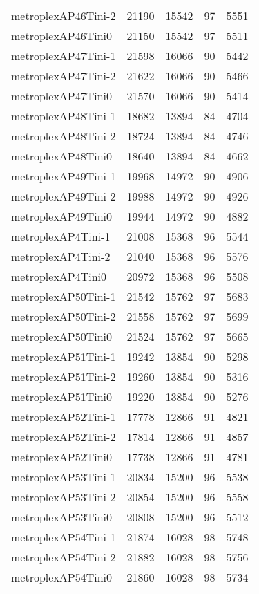 \begin{longtable}{lrrrr}
metroplexAP46Tini-2 & 21190 & 15542 & 97 & 5551 \\
metroplexAP46Tini0 & 21150 & 15542 & 97 & 5511 \\
metroplexAP47Tini-1 & 21598 & 16066 & 90 & 5442 \\
metroplexAP47Tini-2 & 21622 & 16066 & 90 & 5466 \\
metroplexAP47Tini0 & 21570 & 16066 & 90 & 5414 \\
metroplexAP48Tini-1 & 18682 & 13894 & 84 & 4704 \\
metroplexAP48Tini-2 & 18724 & 13894 & 84 & 4746 \\
metroplexAP48Tini0 & 18640 & 13894 & 84 & 4662 \\
metroplexAP49Tini-1 & 19968 & 14972 & 90 & 4906 \\
metroplexAP49Tini-2 & 19988 & 14972 & 90 & 4926 \\
metroplexAP49Tini0 & 19944 & 14972 & 90 & 4882 \\
metroplexAP4Tini-1 & 21008 & 15368 & 96 & 5544 \\
metroplexAP4Tini-2 & 21040 & 15368 & 96 & 5576 \\
metroplexAP4Tini0 & 20972 & 15368 & 96 & 5508 \\
metroplexAP50Tini-1 & 21542 & 15762 & 97 & 5683 \\
metroplexAP50Tini-2 & 21558 & 15762 & 97 & 5699 \\
metroplexAP50Tini0 & 21524 & 15762 & 97 & 5665 \\
metroplexAP51Tini-1 & 19242 & 13854 & 90 & 5298 \\
metroplexAP51Tini-2 & 19260 & 13854 & 90 & 5316 \\
metroplexAP51Tini0 & 19220 & 13854 & 90 & 5276 \\
metroplexAP52Tini-1 & 17778 & 12866 & 91 & 4821 \\
metroplexAP52Tini-2 & 17814 & 12866 & 91 & 4857 \\
metroplexAP52Tini0 & 17738 & 12866 & 91 & 4781 \\
metroplexAP53Tini-1 & 20834 & 15200 & 96 & 5538 \\
metroplexAP53Tini-2 & 20854 & 15200 & 96 & 5558 \\
metroplexAP53Tini0 & 20808 & 15200 & 96 & 5512 \\
metroplexAP54Tini-1 & 21874 & 16028 & 98 & 5748 \\
metroplexAP54Tini-2 & 21882 & 16028 & 98 & 5756 \\
metroplexAP54Tini0 & 21860 & 16028 & 98 & 5734 \\

\end{longtable}
